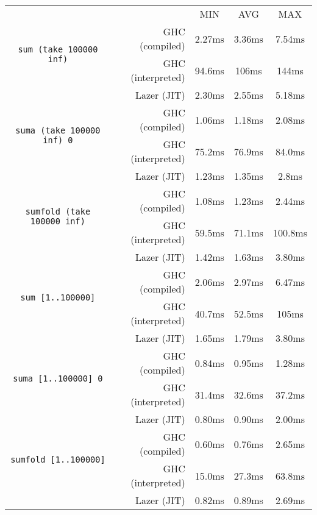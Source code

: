 \documentclass[en]{pracamgr}
\begin{document}
\begin{center}
\begin{tabular}{c r c c c}
    & & MIN & AVG & MAX \\
    \cline{3-5}

    \multirow{2}{*}{\texttt{sum (take 100000 inf)}}
    & GHC (compiled)& 2.27ms & 3.36ms & 7.54ms \\
    & GHC (interpreted)& 94.6ms & 106ms & 144ms \\
    & Lazer (JIT)& 2.30ms & 2.55ms & 5.18ms \\
    \cline{2-5}

    \multirow{2}{*}{\texttt{suma (take 100000 inf) 0}}
    & GHC (compiled)& 1.06ms & 1.18ms & 2.08ms \\
    & GHC (interpreted)& 75.2ms & 76.9ms & 84.0ms \\
    & Lazer (JIT)& 1.23ms & 1.35ms & 2.8ms \\
    \cline{2-5}

    \multirow{2}{*}{\texttt{sumfold (take 100000 inf)}}
    & GHC (compiled)& 1.08ms & 1.23ms & 2.44ms \\
    & GHC (interpreted)& 59.5ms & 71.1ms & 100.8ms \\
    & Lazer (JIT)& 1.42ms & 1.63ms & 3.80ms \\
    \cline{2-5}

    \multirow{2}{*}{\texttt{sum [1..100000]}}
    & GHC (compiled)& 2.06ms & 2.97ms & 6.47ms \\
    & GHC (interpreted)& 40.7ms & 52.5ms & 105ms \\
    & Lazer (JIT)& 1.65ms & 1.79ms & 3.80ms \\
    \cline{2-5}

    \multirow{2}{*}{\texttt{suma [1..100000] 0}}
    & GHC (compiled)& 0.84ms & 0.95ms & 1.28ms \\
    & GHC (interpreted)& 31.4ms & 32.6ms & 37.2ms \\
    & Lazer (JIT)& 0.80ms & 0.90ms & 2.00ms \\
    \cline{2-5}

    \multirow{2}{*}{\texttt{sumfold [1..100000]}}
    & GHC (compiled)& 0.60ms & 0.76ms & 2.65ms \\
    & GHC (interpreted)& 15.0ms & 27.3ms & 63.8ms \\
    & Lazer (JIT)& 0.82ms & 0.89ms & 2.69ms \\
\end{tabular}
\end{center}
\end{document}
